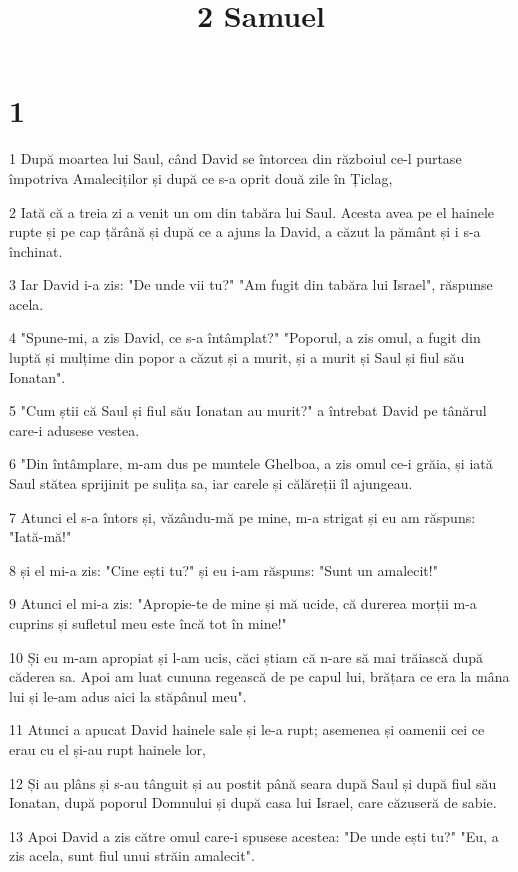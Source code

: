 

\title{2 Samuel}


\chapter{1}

\par 1 După moartea lui Saul, când David se întorcea din războiul ce-l purtase împotriva Amaleciților și după ce s-a oprit două zile în Țiclag,
\par 2 Iată că a treia zi a venit un om din tabăra lui Saul. Acesta avea pe el hainele rupte și pe cap țărână și după ce a ajuns la David, a căzut la pământ și i s-a închinat.
\par 3 Iar David i-a zis: "De unde vii tu?" "Am fugit din tabăra lui Israel", răspunse acela.
\par 4 "Spune-mi, a zis David, ce s-a întâmplat?" "Poporul, a zis omul, a fugit din luptă și mulțime din popor a căzut și a murit, și a murit și Saul și fiul său Ionatan".
\par 5 "Cum știi că Saul și fiul său Ionatan au murit?" a întrebat David pe tânărul care-i adusese vestea.
\par 6 "Din întâmplare, m-am dus pe muntele Ghelboa, a zis omul ce-i grăia, și iată Saul stătea sprijinit pe sulița sa, iar carele și călăreții îl ajungeau.
\par 7 Atunci el s-a întors și, văzându-mă pe mine, m-a strigat și eu am răspuns: "Iată-mă!"
\par 8 și el mi-a zis: "Cine ești tu?" și eu i-am răspuns: "Sunt un amalecit!"
\par 9 Atunci el mi-a zis: "Apropie-te de mine și mă ucide, că durerea morții m-a cuprins și sufletul meu este încă tot în mine!"
\par 10 Și eu m-am apropiat și l-am ucis, căci știam că n-are să mai trăiască după căderea sa. Apoi am luat cununa regească de pe capul lui, brățara ce era la mâna lui și le-am adus aici la stăpânul meu".
\par 11 Atunci a apucat David hainele sale și le-a rupt; asemenea și oamenii cei ce erau cu el și-au rupt hainele lor,
\par 12 Și au plâns și s-au tânguit și au postit până seara după Saul și după fiul său Ionatan, după poporul Domnului și după casa lui Israel, care căzuseră de sabie.
\par 13 Apoi David a zis către omul care-i spusese acestea: "De unde ești tu?" "Eu, a zis acela, sunt fiul unui străin amalecit".
